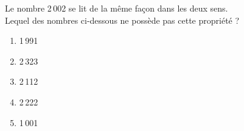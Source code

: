 Le nombre 2\,002 se lit de la même façon dans les deux sens.\\Lequel des nombres ci-dessous ne possède pas cette propriété ?
\begin{multicols}{5}
  \begin{enumerate}[A/]
  \item 1\,991
  \item 2\,323
  \item 2\,112
  \item 2\,222
  \item 1\,001
  \end{enumerate}
\end{multicols}